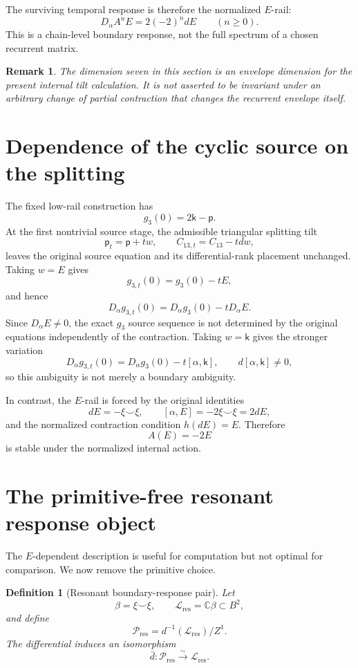 \documentclass[11pt]{amsart}
\newtheorem{definition}[theorem]{Definition}
\newtheorem{remark}[theorem]{Remark}
\newcommand{\C}{\mathbb C}
\begin{document}
The surviving temporal response is therefore the normalized \(E\)-rail:
\[
\boxed{
D_\alpha A^nE=2(-2)^n dE
\qquad(n\geq0).}
\]
This is a chain-level boundary response, not the full spectrum of a chosen recurrent matrix.

\begin{remark}
The dimension seven in this section is an envelope dimension for the present internal tilt calculation.  It is not asserted to be invariant under an arbitrary change of partial contraction that changes the recurrent envelope itself.
\end{remark}

\section{Dependence of the cyclic source on the splitting}

The fixed low-rail construction has
\[
g_3(0)=2\mathsf k-\mathsf p.
\]
At the first nontrivial source stage, the admissible triangular splitting tilt
\[
\mathsf p_t=\mathsf p+t w,
\qquad
C_{13,t}=C_{13}-tdw,
\]
leaves the original source equation and its differential-rank placement unchanged.  Taking \(w=E\) gives
\[
g_{3,t}(0)=g_3(0)-tE,
\]
and hence
\[
D_\alpha g_{3,t}(0)
=D_\alpha g_3(0)-tD_\alpha E.
\]
Since \(D_\alpha E\neq0\), the exact \(g_3\) source sequence is not determined by the original equations independently of the contraction.  Taking \(w=\mathsf k\) gives the stronger variation
\[
D_\alpha g_{3,t}(0)
=D_\alpha g_3(0)-t[\alpha,\mathsf k],
\qquad
d[\alpha,\mathsf k]\neq0,
\]
so this ambiguity is not merely a boundary ambiguity.

In contrast, the \(E\)-rail is forced by the original identities
\[
dE=-\xi\smile\xi,
\qquad
[\alpha,E]=-2\xi\smile\xi=2dE,
\]
and the normalized contraction condition \(h(dE)=E\).  Therefore
\[
A(E)=-2E
\]
is stable under the normalized internal action.

\section{The primitive-free resonant response object}

The \(E\)-dependent description is useful for computation but not optimal for comparison.  We now remove the primitive choice.

\begin{definition}[Resonant boundary-response pair]
Let
\[
\beta=\xi\smile\xi,
\qquad
\mathcal L_{\mathrm{res}}=\C\beta\subset B^2,
\]
and define
\[
\mathcal P_{\mathrm{res}}
=d^{-1}(\mathcal L_{\mathrm{res}})/Z^1.
\]
The differential induces an isomorphism
\[
\bar d:\mathcal P_{\mathrm{res}}\xrightarrow{\sim}\mathcal L_{\mathrm{res}}.
\]
\end{definition}
\end{document}
